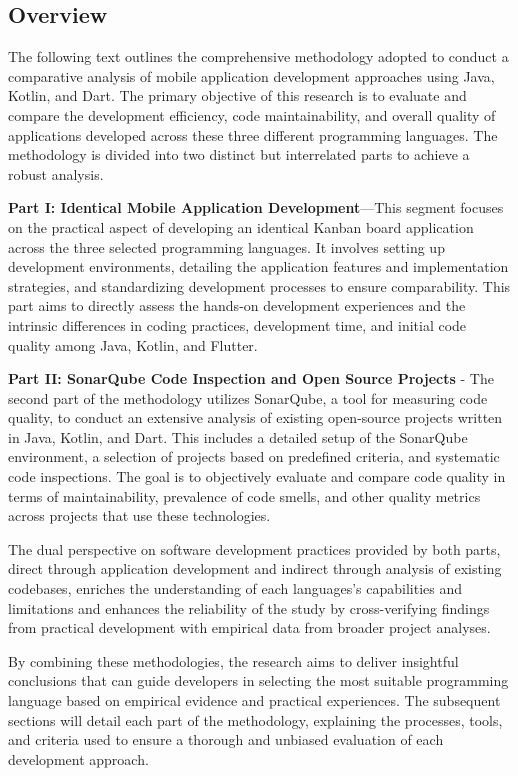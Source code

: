 \subsection{Overview}
The following text outlines the comprehensive methodology adopted to conduct a comparative analysis of mobile application development approaches using Java, Kotlin, and Dart. The primary objective of this research is to evaluate and compare the development efficiency, code maintainability, and overall quality of applications developed across these three different programming languages. The methodology is divided into two distinct but interrelated parts to achieve a robust analysis.
\par
\textbf{Part I: Identical Mobile Application Development}—This segment focuses on the practical aspect of developing an identical Kanban board application across the three selected programming languages. It involves setting up development environments, detailing the application features and implementation strategies, and standardizing development processes to ensure comparability. This part aims to directly assess the hands-on development experiences and the intrinsic differences in coding practices, development time, and initial code quality among Java, Kotlin, and Flutter.
\par
\textbf{Part II: SonarQube Code Inspection and Open Source Projects} - The second part of the methodology utilizes SonarQube, a tool for measuring code quality, to conduct an extensive analysis of existing open-source projects written in Java, Kotlin, and Dart. This includes a detailed setup of the SonarQube environment, a selection of projects based on predefined criteria, and systematic code inspections. The goal is to objectively evaluate and compare code quality in terms of maintainability, prevalence of code smells, and other quality metrics across projects that use these technologies.
\par
The dual perspective on software development practices provided by both parts, direct through application development and indirect through analysis of existing codebases, enriches the understanding of each languages's capabilities and limitations and enhances the reliability of the study by cross-verifying findings from practical development with empirical data from broader project analyses.
\par
By combining these methodologies, the research aims to deliver insightful conclusions that can guide developers in selecting the most suitable programming language based on empirical evidence and practical experiences. The subsequent sections will detail each part of the methodology, explaining the processes, tools, and criteria used to ensure a thorough and unbiased evaluation of each development approach.
